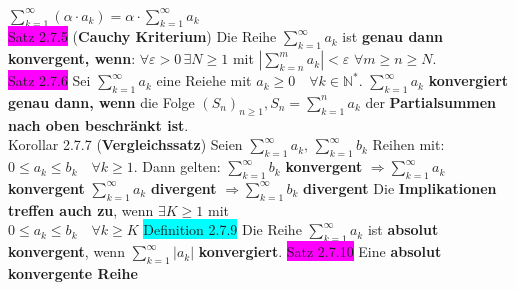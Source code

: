 \documentclass[landscape, 10pt]{article}
\newcommand{\N}{\mathbb{N}}
\begin{document}
\begin{multicols}{3}
                     \textcolor{NavyBlue}{
                     $\sum_{k=1}^\infty(\alpha\cdot a_k)
                     =\alpha\cdot\sum_{k=1}^\infty a_k$}\\
              \colorbox{magenta}{Satz 2.7.5} (\textbf{Cauchy Kriterium}) Die Reihe 
                     \textcolor{NavyBlue}{$\sum_{k=1}^\infty a_k$ }
                     ist \textbf{genau dann konvergent, wenn}:
                     \textcolor{NavyBlue}{$\forall\varepsilon >0\,\exists N\geqslant1$} mit 
                     \textcolor{NavyBlue}{
                     $|\sum_{k=n}^m a_k|<\varepsilon$\quad
                     $\forall m\geqslant n\geqslant N$}. \\
              \colorbox{magenta}{Satz 2.7.6} Sei \textcolor{NavyBlue}{$\sum_{k=1}^\infty a_k$} 
                     eine Reiehe mit \textcolor{NavyBlue}{
                     $a_k\geqslant0\quad\forall k\in\N^*$. $\sum_{k=1}^\infty a_k$}
                     \textbf{konvergiert genau dann, wenn} die Folge 
                     \textcolor{NavyBlue}{$(S_n)_{n\geqslant1},S_n=\sum_{k=1}^n a_k$} 
                     der \textbf{Partialsummen nach oben beschränkt ist}.\\
              \colorbox{BurntOrange}{Korollar 2.7.7} (\textbf{Vergleichssatz}) Seien 
                     \textcolor{NavyBlue}{$\sum_{k=1}^\infty a_k,\,\sum_{k=1}^\infty b_k$} 
                     Reihen mit: 
                     \textcolor{NavyBlue}{$0\leqslant a_k\leqslant b_k\quad\forall k\geqslant1$}. 
                     Dann gelten: 
                     \textcolor{NavyBlue}{$\sum_{k=1}^\infty b_k$} \textbf{konvergent} 
                     \textcolor{NavyBlue}{$\Longrightarrow \sum_{k=1}^\infty a_k$} 
                     \textbf{konvergent}
                     \qquad \textcolor{NavyBlue}{$\sum_{k=1}^\infty a_k$} \textbf{divergent} 
                     \textcolor{NavyBlue}{$\Longrightarrow \sum_{k=1}^\infty b_k$} 
                     \textbf{divergent} 
                     Die \textbf{Implikationen treffen auch zu}, wenn 
                     \textcolor{NavyBlue}{$\exists K\geqslant1$} mit \\
                     \textcolor{NavyBlue}{$0\leqslant a_k\leqslant b_k\quad\forall k\geqslant K$}
              \colorbox{cyan}{Definition 2.7.9} Die Reihe \textcolor{NavyBlue}{$\sum_{k=1}^\infty a_k$} ist 
                     \textbf{absolut konvergent}, 
                     wenn \textcolor{NavyBlue}{$\sum_{k=1}^\infty |a_k|$} 
                     \textbf{konvergiert}.
              \colorbox{magenta}{Satz 2.7.10} Eine \textbf{absolut konvergente Reihe} 

\end{multicols}
\end{document}
